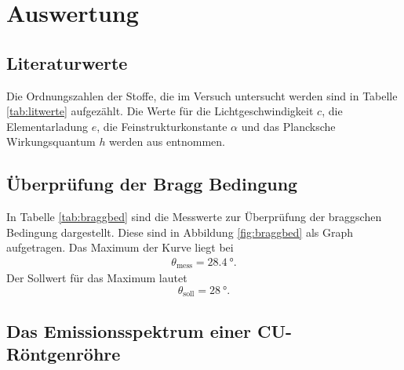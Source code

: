 \section{Auswertung}
\label{sec:Auswertung}

\subsection{Literaturwerte}

Die Ordnungszahlen der Stoffe, die im Versuch untersucht werden sind in
Tabelle \ref{tab:litwerte} aufgezählt.
Die Werte für die Lichtgeschwindigkeit $c$, die Elementarladung $e$, die
Feinstrukturkonstante $\alpha$ und das Plancksche Wirkungsquantum $h$ werden aus
\cite{Codata} entnommen.

\subsection{Überprüfung der Bragg Bedingung}

In Tabelle \ref{tab:braggbed} sind die Messwerte zur Überprüfung der braggschen
Bedingung dargestellt. Diese sind in Abbildung \ref{fig:braggbed} als Graph
aufgetragen.
Das Maximum der Kurve liegt bei
\begin{align}
  \theta_\text{mess} = \SI{28.4}{\degree}.
\end{align}
Der Sollwert für das Maximum lautet
\begin{equation}
  \theta_\text{soll} = \SI{28}{\degree}.
\end{equation}

\subsection{Das Emissionsspektrum einer CU-Röntgenröhre}

